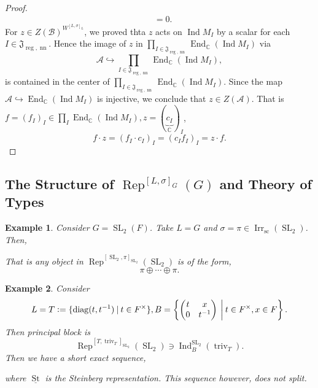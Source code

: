 \documentclass[8pt]{article}
\newtheorem{example}{Example}[section]
\DeclareMathOperator{\triv}{triv}
\DeclareMathOperator{\Ind}{Ind}
\DeclareMathOperator{\SL}{SL}
\DeclareMathOperator{\Rep}{Rep}
\DeclareMathOperator{\End}{End}
\DeclareMathOperator{\Vect}{Vect}
\DeclareMathOperator{\supcus}{sc}
\DeclareMathOperator{\Irr}{Irr}
\DeclareMathOperator{\nn}{nn}
\DeclareMathOperator{\reg}{reg}
\DeclareMathOperator{\diag}{diag}
\DeclareMathOperator{\St}{St}
\newcommand{\defeq}{\vcentcolon=}
\newcommand{\C}[0]{\mathbb{C}}
\newcommand{\sep}[0]{\:|\:}
\newcommand{\cA}{\mathcal{A}}
\newcommand{\cB}{\mathcal{B}}
\begin{document}
\begin{proof}
\begin{align*}
    & = 0.
  \end{align*}
  For $z\in Z(\cB)^{W^{[L,\sigma]_L}}$, we proved thta $z$ acts on $\Ind M_I$ by a scalar for each $I\in \mathfrak{J}_{\reg,\nn}$. Hence the image of $z$ in $\prod_{I\in\mathfrak{J}_{\reg,\nn}}\End_\C(\Ind M_I)$ via 
  \begin{equation*}
    \cA\hookrightarrow\prod_{I\in\mathfrak{J}_{\reg,\nn}}\End_\C(\Ind M_I),
  \end{equation*}
  is contained in the center of $\prod_{I\in\mathfrak{J}_{\reg,\nn}}\End_\C(\Ind M_I)$. Since the map $\cA\hookrightarrow\End_\C(\Ind M_I)$ is injective, we conclude that $z\in Z(\cA)$.
  That is $f=(f_I)_{I}\in\prod_{I}\End_\C(\Ind M_I),z=(\underbrace{c_I}_{\C})_I$, 
  \begin{equation*}
    f\cdot z = (f_I\cdot c_I)_{I}=(c_I f_I)_I = z\cdot f.
  \end{equation*}
\end{proof}

\subsection{The Structure of $\Rep^{[L,\sigma]_G}(G)$ and Theory of Types}

\begin{example}
Consider $G=\SL_2(F)$. Take $L=G$ and $\sigma=\pi\in\Irr_{\supcus}(\SL_2)$. Then,
\begin{center}
\end{center}
That is any object in $\Rep^{[\SL_2,\pi]_{\SL_2}}(\SL_2)$ is of the form,
\begin{equation*}
  \pi\oplus\cdots\oplus\pi.
\end{equation*}
\end{example}

\begin{example}
  Consider 
  \begin{equation*}
    L = T\defeq\{\diag(t,t^{-1})\sep t\in F^\times\}, B = \left\{\begin{pmatrix}
      t & x\\
      0 & t^{-1}
    \end{pmatrix}\:\bigg{|}\: t\in F^\times,x\in F\right\}.
  \end{equation*}
  Then principal block is 
  \begin{equation*}
    \Rep^{[T,\triv_T]_{\SL_2}}(\SL_2)\ni\Ind_B^{\SL_2}(\triv_T).
  \end{equation*}
  Then we have a short exact sequence,
  \begin{center}
  \end{center}
  where $\underline{\St}$ is the Steinberg representation. This sequence however, does not split.
\end{example}
\end{document}
